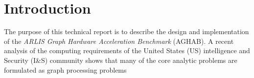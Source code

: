 \section{Introduction}\label{section:introduction}

\par{
    The purpose of this technical report is to describe the design and implementation of the \textit{ARLIS Graph Hardware Acceleration Benchmark} (AGHAB).
    A recent analysis of the computing requirements of the United States (US) intelligence and Security (I\&S) community shows that many of the core analytic problems are formulated as graph processing problems~\cite{}
}